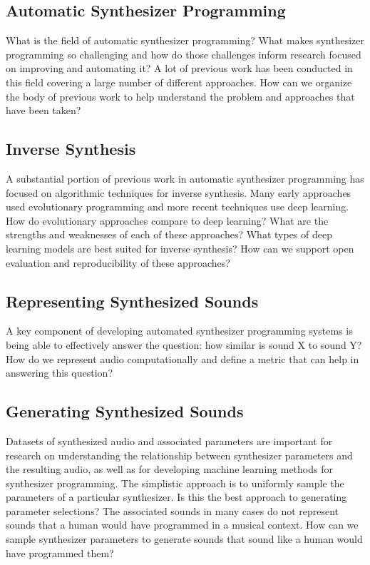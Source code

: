 \subsection{Automatic Synthesizer Programming}
What is the field of automatic synthesizer programming? What makes synthesizer programming so challenging and how do those challenges inform research focused on improving and automating it? A lot of previous work has been conducted in this field covering a large number of different approaches. How can we organize the body of previous work to help understand the problem and approaches that have been taken?

\subsection{Inverse Synthesis}
A substantial portion of previous work in automatic synthesizer programming has focused on algorithmic techniques for inverse synthesis. Many early approaches used evolutionary programming and more recent techniques use deep learning. How do evolutionary approaches compare to deep learning? What are the strengths and weaknesses of each of these approaches? What types of deep learning models are best suited for inverse synthesis? How can we support open evaluation and reproducibility of these approaches?

\subsection{Representing Synthesized Sounds}
A key component of developing automated synthesizer programming systems is being able to effectively answer the question: how similar is sound X to sound Y? How do we represent audio computationally and define a metric that can help in answering this question?

\subsection{Generating Synthesized Sounds}
Datasets of synthesized audio and associated parameters are important for research on understanding the relationship between synthesizer parameters and the resulting audio, as well as for developing machine learning methods for synthesizer programming. The simplistic approach is to uniformly sample the parameters of a particular synthesizer. Is this the best approach to generating parameter selections? The associated sounds in many cases do not represent sounds that a human would have programmed in a musical context. How can we sample synthesizer parameters to generate sounds that sound like a human would have programmed them?

